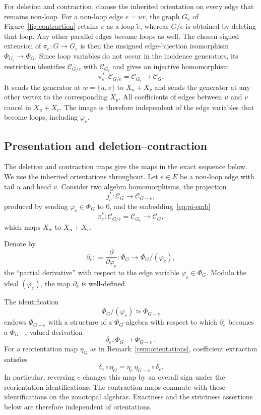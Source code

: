 \documentclass[reqno]{article}
\theoremstyle{plain} %
\theoremstyle{definition}
\theoremstyle{remark}
\newcommand {\CC}{\mathscr{C}}
\numberwithin{equation}{section}
\begin{document}
For deletion and contraction, choose the inherited orientation on every
edge that remains non-loop. For a non-loop edge $e=uv$, the graph $G_e$
of Figure~\ref{fig:contraction} retains $e$ as a loop $\widetilde e$, whereas $G/e$
is obtained by deleting that loop. Any other parallel edges become
loops as well. The chosen signed extension of $\pi_e:G\to G_e$ is then
the unsigned edge-bijection isomorphism $\Phi_{G_e}\to\Phi_G$.
Since loop variables do not occur in the incidence generators, its
restriction identifies $\CC_{G/e}$ with $\CC_{G_e}$ and gives an
injective homomorphism
\begin{equation}\label{eq:pi-emb}
\pi_e^*:\CC_{G/e}=\CC_{G_e}\longrightarrow\CC_G.
\end{equation}
It sends the generator at $w=\{u,v\}$ to $X_u+X_v$ and sends the
generator at any other vertex to the corresponding $X_p$. All
coefficients of edges between $u$ and $v$ cancel in $X_u+X_v$.
The image is therefore independent of the edge variables that become
loops, including $\varphi_e$.

\subsection{Presentation and deletion--contraction}
\label{sec:exact}

The deletion and contraction maps give the maps in the exact sequence
below. We use the inherited orientations throughout. Let $e\in E$ be a non-loop edge
with tail $u$ and head $v$.
Consider two algebra homomorphisms, the projection
\begin{equation}
  \label{eq:j-proj}
j_e^*\colon \CC_G\to \CC_{G-e},
\end{equation}
produced by sending $\varphi_e\in \Phi_G$ to $0$, and the embedding~\eqref{eq:pi-emb}
 \[
\pi_e^*\colon \CC_{G/e}=\CC_{G_e}\to \CC_G, \]
which maps $X_w$ to $X_u+X_v$.


Denote by
\begin{equation}
  \label{eq:derivative}
 \partial_e: = \frac{\partial}{\partial
   \varphi_e}\colon \Phi_G\to \Phi_G/(\varphi_e),
\end{equation}
the ``partial derivative'' with respect to the edge variable $\varphi_e\in \Phi_G$.
Modulo the ideal $(\varphi_e)$, the map $ \partial_e$ is well-defined.

The identification
   \[
  \Phi_G/(\varphi_e)\simeq \Phi_{G-e}
   \]
  endows $\Phi_{G-e}$ with a structure of a $\Phi_G$-algebra with respect to which  $\partial_e$ becomes a $\Phi_{G-e}$-valued derivation
   \[
  \delta_e\colon \Phi_G\to \Phi_{G-e}~.
   \]
For a reorientation map $\eta_G$ as in Remark~\ref{rem:orientations},
coefficient extraction satisfies
\[
\delta_e\circ\eta_G=\eta_e\,\eta_{G-e}\circ\delta_e.
\]
In particular, reversing $e$ changes this map by an overall sign under
the reorientation identifications. The contraction maps commute with
these identifications on the zonotopal algebras. Exactness and the
strictness assertions below are therefore independent of orientations.
\end{document}
